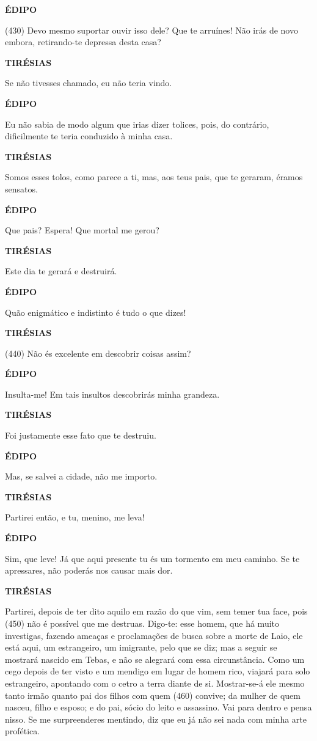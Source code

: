 \textbf{ÉDIPO}

(430) Devo mesmo suportar ouvir isso dele? Que te arruínes! Não irás de
novo embora, retirando-te depressa desta casa?

\textbf{TIRÉSIAS}

Se não tivesses chamado, eu não teria vindo.

\textbf{ÉDIPO}

Eu não sabia de modo algum que irias dizer tolices, pois, do contrário,
dificilmente te teria conduzido à minha casa.

\textbf{TIRÉSIAS}

Somos esses tolos, como parece a ti, mas, aos teus pais, que te geraram,
éramos sensatos.

\textbf{ÉDIPO}

Que pais? Espera! Que mortal me gerou?

\textbf{TIRÉSIAS}

Este dia te gerará e destruirá.

\textbf{ÉDIPO}

Quão enigmático e indistinto é tudo o que dizes!

\textbf{TIRÉSIAS}

(440) Não és excelente em descobrir coisas assim?

\textbf{ÉDIPO}

Insulta-me! Em tais insultos descobrirás minha grandeza.

\textbf{TIRÉSIAS}

Foi justamente esse fato que te destruiu.

\textbf{ÉDIPO}

Mas, se salvei a cidade, não me importo.

\textbf{TIRÉSIAS}

Partirei então, e tu, menino, me leva!

\textbf{ÉDIPO}

Sim, que leve! Já que aqui presente tu és um tormento em meu caminho. Se
te apressares, não poderás nos causar mais dor.

\textbf{TIRÉSIAS}

Partirei, depois de ter dito aquilo em razão do que vim, sem temer tua
face, pois (450) não é possível que me destruas. Digo-te: esse homem,
que há muito investigas, fazendo ameaças e proclamações de busca sobre a
morte de Laio, ele está aqui, um estrangeiro, um imigrante, pelo que se
diz; mas a seguir se mostrará nascido em Tebas, e não se alegrará com
essa circunstância. Como um cego depois de ter visto e um mendigo em
lugar de homem rico, viajará para solo estrangeiro, apontando com o
cetro a terra diante de si. Mostrar-se-á ele mesmo tanto irmão quanto
pai dos filhos com quem (460) convive; da mulher de quem nasceu, filho e
esposo; e do pai, sócio do leito e assassino. Vai para dentro e pensa
nisso. Se me surpreenderes mentindo, diz que eu já não sei nada com
minha arte profética.

